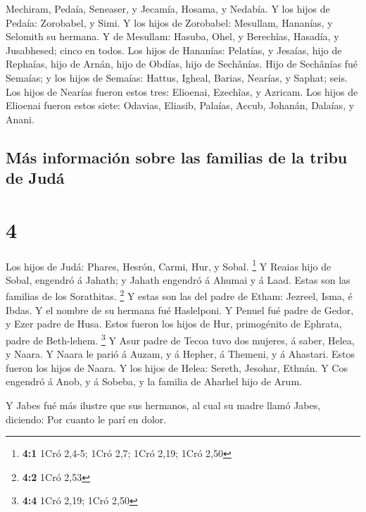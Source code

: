  Mechiram, Pedaía, Seneaser, y Jecamía, Hosama, y Nedabía.
 Y los hijos de Pedaía: Zorobabel, y Simi. Y los hijos de
Zorobabel: Mesullam, Hananías, y Selomith su hermana.  Y de
Mesullam: Hasuba, Ohel, y Berechîas, Hasadía, y Jusabhesed; cinco en
todos.  Los hijos de Hananías: Pelatías, y Jesaías, hijo de
Rephaías, hijo de Arnán, hijo de Obdías, hijo de Sechânías.
 Hijo de Sechânías fué Semaías; y los hijos de Semaías:
Hattus, Igheal, Barias, Nearías, y Saphat; seis.  Los hijos
de Nearías fueron estos tres: Elioenai, Ezechîas, y Azricam.
 Los hijos de Elioenai fueron estos siete: Odavias,
Eliasib, Palaías, Accub, Johanán, Dalaías, y Anani.

\hypertarget{muxe1s-informaciuxf3n-sobre-las-familias-de-la-tribu-de-juduxe1}{%
\subsection{Más información sobre las familias de la tribu de
Judá}\label{muxe1s-informaciuxf3n-sobre-las-familias-de-la-tribu-de-juduxe1}}

\hypertarget{section-3}{%
\section{4}\label{section-3}}

 Los hijos de Judá: Phares, Hesrón, Carmi, Hur, y Sobal.
\footnote{\textbf{4:1} 1Cró 2,4-5; 1Cró 2,7; 1Cró 2,19; 1Cró 2,50}
 Y Reaias hijo de Sobal, engendró á Jahath; y Jahath
engendró á Ahumai y á Laad. Estas son las familias de los Sorathitas.
\footnote{\textbf{4:2} 1Cró 2,53}  Y estas son las del padre
de Etham: Jezreel, Isma, é Ibdas. Y el nombre de su hermana fué
Haslelponi.  Y Penuel fué padre de Gedor, y Ezer padre de
Husa. Estos fueron los hijos de Hur, primogénito de Ephrata, padre de
Beth-lehem. \footnote{\textbf{4:4} 1Cró 2,19; 1Cró 2,50}  Y
Asur padre de Tecoa tuvo dos mujeres, á saber, Helea, y Naara.
 Y Naara le parió á Auzam, y á Hepher, á Themeni, y á
Ahastari. Estos fueron los hijos de Naara.  Y los hijos de
Helea: Sereth, Jesohar, Ethnán.  Y Cos engendró á Anob, y á
Sobeba, y la familia de Aharhel hijo de Arum.

 Y Jabes fué más ilustre que sus hermanos, al cual su madre
llamó Jabes, diciendo: Por cuanto le parí en dolor.

